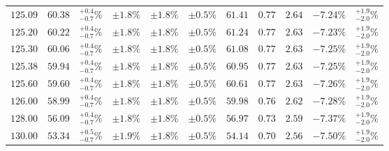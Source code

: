 \begin{table}[ht!]
{{\begin{tabular}{| cc | c | ccc | cccc | c |}
$125.09$ & $60.38$ & $^{+0.4}_{-0.7}\%$ & $\pm 1.8\%$ & {\color{black!55}$\pm 1.8\%$} & {\color{black!55}$\pm 0.5\%$} & $61.41$ & $0.77$ & $2.64$ & $-7.24\%$ & $^{+1.9}_{-2.0}\%$ \\
$125.20$ & $60.22$ & $^{+0.4}_{-0.7}\%$ & $\pm 1.8\%$ & {\color{black!55}$\pm 1.8\%$} & {\color{black!55}$\pm 0.5\%$} & $61.24$ & $0.77$ & $2.63$ & $-7.23\%$ & $^{+1.9}_{-2.0}\%$ \\
$125.30$ & $60.06$ & $^{+0.4}_{-0.7}\%$ & $\pm 1.8\%$ & {\color{black!55}$\pm 1.8\%$} & {\color{black!55}$\pm 0.5\%$} & $61.08$ & $0.77$ & $2.63$ & $-7.25\%$ & $^{+1.9}_{-2.0}\%$ \\
$125.38$ & $59.94$ & $^{+0.4}_{-0.7}\%$ & $\pm 1.8\%$ & {\color{black!55}$\pm 1.8\%$} & {\color{black!55}$\pm 0.5\%$} & $60.95$ & $0.77$ & $2.63$ & $-7.25\%$ & $^{+1.9}_{-2.0}\%$ \\
$125.60$ & $59.60$ & $^{+0.4}_{-0.7}\%$ & $\pm 1.8\%$ & {\color{black!55}$\pm 1.8\%$} & {\color{black!55}$\pm 0.5\%$} & $60.61$ & $0.77$ & $2.63$ & $-7.26\%$ & $^{+1.9}_{-2.0}\%$ \\
$126.00$ & $58.99$ & $^{+0.4}_{-0.7}\%$ & $\pm 1.8\%$ & {\color{black!55}$\pm 1.8\%$} & {\color{black!55}$\pm 0.5\%$} & $59.98$ & $0.76$ & $2.62$ & $-7.28\%$ & $^{+1.9}_{-2.0}\%$ \\
$128.00$ & $56.09$ & $^{+0.4}_{-0.7}\%$ & $\pm 1.8\%$ & {\color{black!55}$\pm 1.8\%$} & {\color{black!55}$\pm 0.5\%$} & $56.97$ & $0.73$ & $2.59$ & $-7.37\%$ & $^{+1.9}_{-2.0}\%$ \\
$130.00$ & $53.34$ & $^{+0.5}_{-0.7}\%$ & $\pm 1.9\%$ & {\color{black!55}$\pm 1.8\%$} & {\color{black!55}$\pm 0.5\%$} & $54.14$ & $0.70$ & $2.56$ & $-7.50\%$ & $^{+1.9}_{-2.0}\%$ \\
\cline{1-11}
\end{tabular}
}
}
\end{table}

